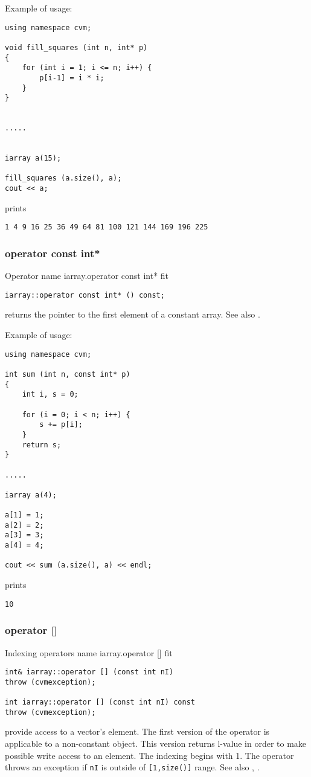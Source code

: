 Example of usage:
\begin{verbatim}
using namespace cvm;

void fill_squares (int n, int* p)
{
    for (int i = 1; i <= n; i++) {
        p[i-1] = i * i;
    }
}


.....


iarray a(15);

fill_squares (a.size(), a);
cout << a;
\end{verbatim}
prints
\begin{verbatim}
1 4 9 16 25 36 49 64 81 100 121 144 169 196 225
\end{verbatim}
\newpage





\subsubsection{operator const int*}
Operator%
\pdfdest name {iarray.operator const int*} fit
\begin{verbatim}
iarray::operator const int* () const;
\end{verbatim}
returns the pointer to the first
element of a constant array.
See also .

Example of usage:
\begin{verbatim}
using namespace cvm;

int sum (int n, const int* p)
{
    int i, s = 0;

    for (i = 0; i < n; i++) {
        s += p[i];
    }
    return s;
}

.....

iarray a(4);

a[1] = 1;
a[2] = 2;
a[3] = 3;
a[4] = 4;

cout << sum (a.size(), a) << endl;
\end{verbatim}
prints
\begin{verbatim}
10
\end{verbatim}
\newpage







\subsubsection{operator []}
Indexing operators%
\pdfdest name {iarray.operator []} fit
\begin{verbatim}
int& iarray::operator [] (const int nI)
throw (cvmexception);

int iarray::operator [] (const int nI) const
throw (cvmexception);
\end{verbatim}
provide access to a vector's element. The first version
of the operator is applicable to a non-constant object.
This version returns l-value
in order to make possible write access to an element.
The indexing begins with 1. The operator throws an exception
if \verb"nI" is outside of \verb"[1,size()]" range.
See also , .

